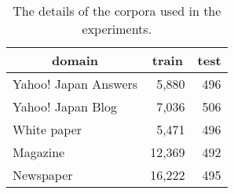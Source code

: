 \documentclass[11pt,letterpaper]{article}
\begin{document}
\begin{table}[t]
 \begin{center}                                                                                                                                                                                                                                                                                                             
\caption{The details of the corpora used in the experiments.}                                                                                                                                                                                                                                                                                 
\label{bccwj}                                                                                                                                                                                                                                                                                                              
 \begin{tabular}{p{45mm} rr}                                                                                                                                  
  \toprule                                                                                                                                                    
        \multicolumn{1}{c}{domain} & \multicolumn{1}{c}{train} &\multicolumn{1}{c}{test} \\                                                                                             
        \midrule                                                                                                                                                                                                                                                                                                            
    Yahoo! Japan Answers  &5,880&496 \\    
    Yahoo! Japan Blog&7,036&506\\                                                                                                                                  
    White paper&5,471 &496 \\                                                                 
    Magazine &12,369 &492  \\   
    Newspaper &16,222 &495\\                                                                                                                                

\end{tabular}
\end{center}
\end{table}
\end{document}
